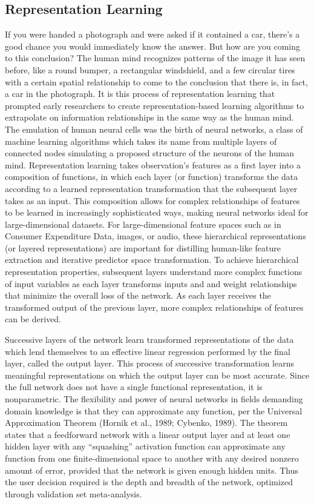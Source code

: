 \documentclass[12pt,twoside]{reedthesis}
\begin{document}
\subsection{Representation Learning}\label{representation-learning}

If you were handed a photograph and were asked if it contained a car,
there's a good chance you would immediately know the answer. But how are
you coming to this conclusion? The human mind recognizes patterns of the
image it has seen before, like a round bumper, a rectangular windshield,
and a few circular tires with a certain spatial relationship to come to
the conclusion that there is, in fact, a car in the photograph. It is
this process of representation learning that prompted early researchers
to create representation-based learning algorithms to extrapolate on
information relationships in the same way as the human mind. The
emulation of human neural cells was the birth of neural networks, a
class of machine learning algorithms which takes its name from multiple
layers of connected nodes simulating a proposed structure of the neurons
of the human mind. Representation learning takes observation's features
as a first layer into a composition of functions, in which each layer
(or function) transforms the data according to a learned representation
transformation that the subsequent layer takes as an input. This
composition allows for complex relationships of features to be learned
in increasingly sophisticated ways, making neural networks ideal for
large-dimensional datasets. For large-dimensional feature spaces such as
in Consumer Expenditure Data, images, or audio, these hierarchical
representations (or layered representations) are important for
distilling human-like feature extraction and iterative predictor space
transformation. To achieve hierarchical representation properties,
subsequent layers understand more complex functions of input variables
as each layer transforms inputs and and weight relationships that
minimize the overall loss of the network. As each layer receives the
transformed output of the previous layer, more complex relationships of
features can be derived.

Successive layers of the network learn transformed representations of
the data which lend themselves to an effective linear regression
performed by the final layer, called the output layer. This process of
successive transformation learns meaningful representations on which the
output layer can be most accurate. Since the full network does not have
a single functional representation, it is nonparametric. The flexibility
and power of neural networks in fields demanding domain knowledge is
that they can approximate any function, per the Universal Approximation
Theorem (Hornik et al., 1989; Cybenko, 1989). The theorem states that a
feedforward network with a linear output layer and at least one hidden
layer with any ``squashing'' activation function can approximate any
function from one finite-dimensional space to another with any desired
nonzero amount of error, provided that the network is given enough
hidden units. Thus the user decision required is the depth and breadth
of the network, optimized through validation set meta-analysis.
\end{document}
